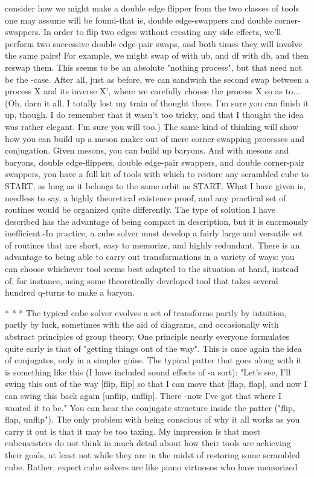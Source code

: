 consider how we might make a double edge flipper from the two classes of tools one
may assume will be found-that is, double edge-swappers and double corner-swappers.
In order to flip two edges without creating any side effects, we'll perform two
successive double edge-pair swaps, and both times they will involve the same pairs!
For example, we might swap of with ub, and df with db, and then reswap them. This
seems to be an absolute "nothing process", but that need not be the -case. After all,
just as before, we can sandwich the second swap between a process X and its inverse
X', where we carefully choose the process X so as to... (Oh, darn it all, I totally lost
my train of thought there. I'm sure you can finish it up, though. I do remember that it
wasn't too tricky, and that I thought the idea was rather elegant. I'm sure you will too.)
        The same kind of thinking will show how you can build up a meson maker out
of mere corner-swapping processes and conjugation. Given mesons, you can build up
baryons. And with mesons and baryons, double edge-flippers, double edge-pair
swappers, and double corner-pair swappers, you have a full kit of tools with which to
restore any scrambled cube to START, as long as it belongs to the same orbit as
START. What I have given is, needless to say, a highly theoretical existence proof,
and any practical set of routines would be organized quite differently. The type of
solution I have described has the advantage of being compact in description, but it is
enormously inefficient.-In practice, a cube solver must develop a fairly large and
versatile set of routines that are short, easy to memorize, and highly redundant. There
is an advantage to being able to carry out transformations in a variety of ways: you
can choose whichever tool seems best adapted to the situation at hand, instead of, for
instance, using some theoretically developed tool that takes several hundred q-turns to
make a baryon.

                                           * * *
         The typical cube solver evolves a set of transforms partly by intuition, partly
by luck, sometimes with the aid of diagrams, and occasionally with abstract principles
of group theory. One principle nearly everyone formulates quite early is that of
"getting things out of the way". This is once again the idea of conjugates, only in a
simpler guise. The typical patter that goes along with it is something like this (I have
included sound effects of -a sort): "Let's see, I'll swing this out of the way [flip, flip]
so that I can move that [flap, flap], and now I can swing this back again [unflip,
unflip]. There -now I've got that where I wanted it to be." You can hear the conjugate
structure inside the patter ("flip, flap, unflip").
         The only problem with being conscious of why it all works as you carry it out
is that it may be too taxing. My impression is that most cubemeisters do not think in
much detail about how their tools are achieving their goals, at least not while they are
in the midst of restoring some scrambled cube. Rather, expert cube solvers are like
piano virtuosos who have memorized




